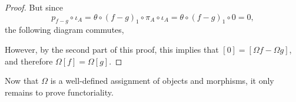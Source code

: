 \begin{proof}
    But since
    \[
        p_{f - g} \circ \iota_A = \theta \circ (f-g)_1 \circ \pi_A \circ \iota_A = \theta \circ (f-g)_1 \circ 0 = 0,
    \]
    the following diagram commutes,
    \begin{center}
    \end{center}
    However, by the second part of this proof, this implies that \( [0] = [\Omega f - \Omega g] \), and therefore \( \Omega [f] = \Omega [g] \).
\end{proof}

Now that \( \Omega \) is a well-defined assignment of objects and morphisms, it only remains to prove functoriality.

